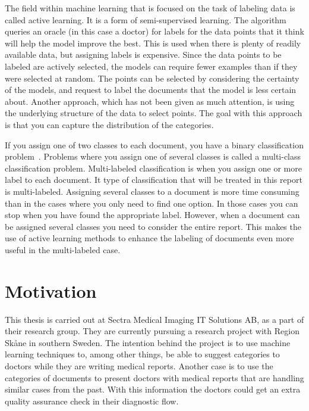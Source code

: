 The field within machine learning that is focused on the task of labeling data is called active learning.
It is a form of semi-supervised learning.
The algorithm queries an oracle (in this case a doctor) for labels for the data points that it think will help the model improve the best.
This is used when there is plenty of readily available data, but assigning labels is expensive.
Since the data points to be labeled are actively selected, the models can require fewer examples than if they were selected at random.
The points can be selected by considering the certainty of the models, and request to label the documents that the model is less certain about.
Another approach, which has not been given as much attention, is using the underlying structure of the data to select points.
The goal with this approach is that you can capture the distribution of the categories.

If you assign one of two classes to each document, you have a binary classification problem~\cite{bishop2006pattern}.
Problems where you assign one of several classes is called a multi-class classification problem.
Multi-labeled classification is when you assign one or more label to each document.
It type of classification that will be treated in this report is multi-labeled.
Assigning several classes to a document is more time consuming than in the cases where you only need to find one option.
In those cases you can stop when you have found the appropriate label.
However, when a document can be assigned several classes you need to consider the entire report.
This makes the use of active learning methods to enhance the labeling of documents even more useful in the multi-labeled case.

\section{Motivation}
\label{sec:motivation}

This thesis is carried out at Sectra Medical Imaging IT Solutions AB, as a part of their research group.
They are currently pursuing a research project with Region Skåne in southern Sweden.
The intention behind the project is to use machine learning techniques to, among other things, be able to suggest categories to doctors while they are writing medical reports.
Another case is to use the categories of documents to present doctors with medical reports that are handling similar cases from the past.
With this information the doctors could get an extra quality assurance check in their diagnostic flow.

